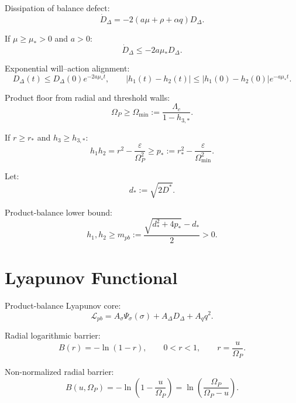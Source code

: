 \documentclass[11pt,a4paper]{article}
\newcommand{\Om}{\Omega_P}
\theoremstyle{remark}
\begin{document}
Dissipation of balance defect:
\begin{equation}
  \dot D_\Delta=-2(a\mu+\rho+\alpha q)D_\Delta.
\end{equation}

If $\mu\ge\mu_*>0$ and $a>0$:
\begin{equation}
  \dot D_\Delta\le -2a\mu_*D_\Delta.
\end{equation}

Exponential will--action alignment:
\begin{equation}
  D_\Delta(t)\le D_\Delta(0)e^{-2a\mu_*t},
  \qquad
  |h_1(t)-h_2(t)|\le |h_1(0)-h_2(0)|e^{-a\mu_*t}.
\end{equation}

Product floor from radial and threshold walls:
\begin{equation}
  \Om\ge \Omega_{\min}:=\frac{\Lambda_c}{1-h_{3,*}}.
\end{equation}

If $r\ge r_*$ and $h_3\ge h_{3,*}$:
\begin{equation}
  h_1h_2=r^2-\frac{\varepsilon}{\Om^2}
  \ge p_*:=r_*^2-\frac{\varepsilon}{\Omega_{\min}^2}.
\end{equation}

Let:
\begin{equation}
  d_*:=\sqrt{2D^*}.
\end{equation}

Product-balance lower bound:
\begin{equation}
  h_1,h_2\ge m_{pb}:=\frac{\sqrt{d_*^2+4p_*}-d_*}{2}>0.
\end{equation}

\section{Lyapunov Functional}

Product-balance Lyapunov core:
\begin{equation}
  \mathcal L_{pb}=A_\sigma\Psi_\sigma(\sigma)+A_\Delta D_\Delta+A_q q^2.
\end{equation}

Radial logarithmic barrier:
\begin{equation}
  B(r)=-\ln(1-r),
  \qquad
  0<r<1,
  \qquad
  r=\frac{u}{\Om}.
\end{equation}

Non-normalized radial barrier:
\begin{equation}
  B(u,\Om)=-\ln\left(1-\frac{u}{\Om}\right)
  =\ln\left(\frac{\Om}{\Om-u}\right).
\end{equation}
\end{document}
